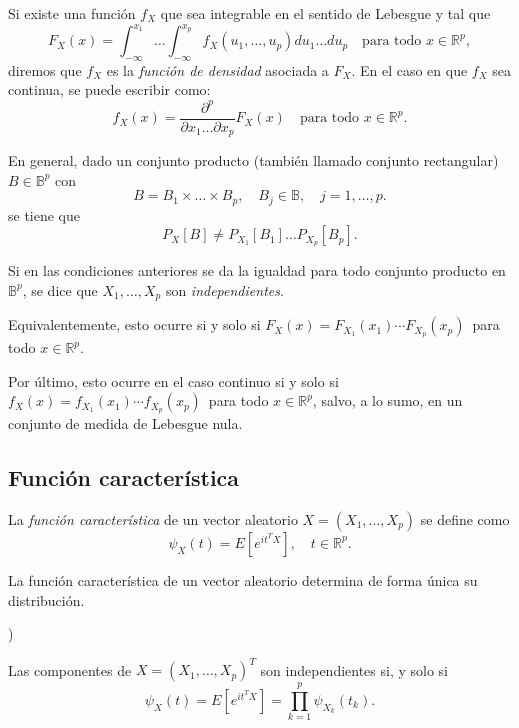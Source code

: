 \begin{ndef}
    Si existe una función $f_X$ que sea integrable en el sentido de Lebesgue y tal que
    \[
    F_X(x) = \int^{x_1}_{-\infty} \dots \int^{x_p}_{-\infty} f_X(u_1, \dots,  u_p) du_1 \dots du_p \quad \text{para todo } x \in \mathbb{R}^p
    ,\]
    diremos que $f_X$ es la \textit{función de densidad} asociada a  $F_X$. En el caso en que $f_X$ sea continua, se puede escribir como:
    \[
    f_X(x) = \frac{\partial^p}{\partial x_1 \dots \partial x_p} F_X(x) \quad \text{para todo } x \in \mathbb{R}^p
    .\]
\end{ndef}

En general, dado un conjunto producto (también llamado conjunto rectangular) $B \in \mathbb{B}^p$ con
\[
    B = B_1 \times \dots \times B_p,\quad B_j \in \mathbb{B}, \quad j = 1, \dots, p
.\]
se tiene que
\[
P_X[B] \neq P_{X_1}[B_1] \dots  P_{X_p}[B_p].
\]

\begin{ndef}
    Si en las condiciones anteriores se da la igualdad para todo conjunto producto en \(\mathbb{B}^p\), se dice que \(X_1, \dots, X_p\) son \textit{independientes}.

    Equivalentemente, esto ocurre si y solo si \(
    F_X (x) = F_{X_1} (x_1) \cdots F_{X_p}(x_p)\,\) para todo \(x \in \mathbb{R}^p\).

    Por último, esto ocurre en el caso continuo si y solo si \(f_X (x) = f_{X_1}(x_1) \cdots f_{X_p}(x_p)\,\) para todo \(x \in \mathbb{R}^p\), salvo, a lo sumo, en un conjunto de medida de Lebesgue nula.
\end{ndef}

\subsection{Función característica}

\begin{ndef}
    La \textit{función característica} de un vector aleatorio \(X = (X_1,\dots,X_p)\) se define como \[\psi_X(t)=E[e^{it^TX}], \quad t\in \mathbb{R}^p.\]
\end{ndef}

\begin{nth}[Unicidad]
  La función característica de un vector aleatorio determina de forma única su distribución.
\end{nth})

\begin{nprop}
  Las componentes de \(X=(X_1,\dots,X_p)^T\) son independientes si, y solo si \[\psi_X(t)=E[e^{it^TX}] = \prod_{k=1}^p\psi_{X_k}(t_k).\]
\end{nprop}

